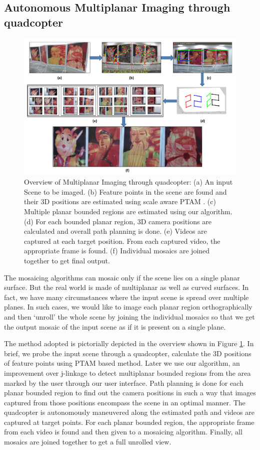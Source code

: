 \subsection{Autonomous Multiplanar Imaging through quadcopter}
\begin{figure}[h!]
\centering
\includegraphics[width=0.98\linewidth]{figures/multiplanar/workflow}
\caption[Overflow of autonomous multiplanar imaging through quadcopter]{Overview
of Multiplanar Imaging through quadcopter:
(a) An input Scene to be imaged.
(b) Feature points in the scene are found and their 3D positions are estimated
using scale aware PTAM \cite{Engel12}. (c) Multiple planar bounded regions are
estimated using our algorithm. (d) For each bounded planar region, 3D camera
positions are calculated and overall path planning is done. (e) Videos are
captured at each target position. From each captured video, the appropriate
frame is found. (f) Individual mosaics are joined together to get final output.}
\label{fig:multiplanar_workflow}
\end{figure}

The mosaicing algorithms can mosaic only if the scene lies on a single planar
surface. But the real world is made of multiplanar as well as curved surfaces.
In fact, we have many circumstances where the input scene is spread over
multiple planes. In such cases, we would like to image each planar region
orthographically and then `unroll' the whole scene by joining the individual
mosaics so that we get the output mosaic of the input scene as if it is present
on a single plane.

The method adopted is pictorially depicted in the overview shown in Figure
\ref{fig:multiplanar_workflow}. In brief, we probe the
input scene through a quadcopter, calculate the 3D positions of feature points
using PTAM based method\cite{engel}. Later we use our algorithm, an improvement
over j-linkage\cite{jlinkage} to detect multiplanar bounded regions from the area
marked by the user through our user interface. Path planning is done for each
planar bounded region to find out the camera positions in such a way
that images captured from those positions encompass the scene in an optimal manner.
The quadcopter is autonomously maneuvered along the estimated path and videos
are captured at target points. For each planar bounded region, the appropriate
frame from each video is found and then given to a mosaicing algorithm. 
Finally, all mosaics are joined together to get a full unrolled view.

